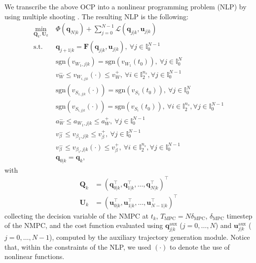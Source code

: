 We transcribe the above OCP into a nonlinear programming problem (NLP) by using multiple shooting \cite{Bock1984MultipleShooting}. The resulting NLP is the following:
\begin{equation*}
    \begin{aligned}
        \min_{\bm{Q}_k, \bm{U}_k} \;
            & \Phi(\bm{q}_{N|k}) + \sum_{j=0}^{N-1} \mathcal{L}(\bm{q}_{j|k}, \bm{u}_{j|k}) \\
            \text{s.t. } & \bm{q}_{j+1|k} = \bm{F}(\bm{q}_{j|k}, \bm{u}_{j|k}),\: \forall j \in \mathbb{I}_0^{N-1} \\
                         & \mathrm{sgn}(v_{W_1,j|k}) = \mathrm{sgn}(v_{W_1}(t_0)),\: \forall j \in \mathbb{I}_0^N \\
                         & v_W^- \le v_{W_{i,j|k}}(\cdot) \le v_W^+,\: \forall i \in \mathbb{I}_2^{n_s}, \forall j \in \mathbb{I}_0^{N-1} \\
                         & \mathrm{sgn}(v_{S_{1,j|k}}(\cdot)) = \mathrm{sgn}(v_{S_1}(t_0)),\: \forall j \in \mathbb{I}_0^N \\
                         & \mathrm{sgn}(v_{S_{i,j|k}}(\cdot)) = \mathrm{sgn}(v_{S_i}(t_0)),\: \forall i \in \mathbb{I}_2^{n_s}, \forall j \in \mathbb{I}_0^{N-1} \\
                         & a_W^- \le a_{W_1,j|k} \le a_W^+,\: \forall j \in \mathbb{I}_0^{N-1} \\
                         & v_{\beta}^- \le v_{\beta_1,j|k} \le v_{\beta}^+,\: \forall j \in \mathbb{I}_0^{N-1} \\
                         & v_{\beta}^- \le v_{\beta_i,j|k}(\cdot) \le v_{\beta}^+,\: \forall i \in \mathbb{I}_2^{n_s}, \forall j \in \mathbb{I}_0^{N-1} \\
                         & \bm{q}_{0|k} = \bm{q}_k,
    \end{aligned}
\end{equation*}
with
\begin{align*}
\bm{Q}_k &= (\bm{q}_{0|k}^\top, \bm{q}_{1|k}^\top, \dots, \bm{q}_{N|k}^\top)^\top \\
\bm{U}_k &= (\bm{u}_{0|k}^\top, \bm{u}_{1|k}^\top, \dots, \bm{u}_{N-1|k}^\top)^\top
\end{align*}
collecting the decision variable of the NMPC at $t_k$, $T_{\mathrm{MPC}}=N\delta_{\mathrm{MPC}}$, $\delta_{\mathrm{MPC}}$ timestep of the NMPC, and the cost function evaluated using $\bm{q}_{j|k}^{\mathrm{aux}}$ ($j = 0, \dots, N$) and $\bm{u}_{j|k}^{\mathrm{aux}}$ ($j = 0, \dots, N - 1$), computed by the auxiliary trajectory generation module. Notice that, within the constraints of the NLP, we used $(\cdot)$ to denote the use of nonlinear functions.

